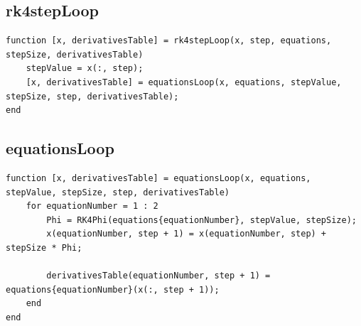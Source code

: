 \subsection{rk4stepLoop}
\begin{simplechar}
\begin{lstlisting}
function [x, derivativesTable] = rk4stepLoop(x, step, equations, stepSize, derivativesTable)
    stepValue = x(:, step);
    [x, derivativesTable] = equationsLoop(x, equations, stepValue, stepSize, step, derivativesTable);
end
\end{lstlisting}
\end{simplechar}

\subsection{equationsLoop}
\begin{simplechar}
\begin{lstlisting}
function [x, derivativesTable] = equationsLoop(x, equations, stepValue, stepSize, step, derivativesTable)
    for equationNumber = 1 : 2
        Phi = RK4Phi(equations{equationNumber}, stepValue, stepSize);
        x(equationNumber, step + 1) = x(equationNumber, step) + stepSize * Phi;

        derivativesTable(equationNumber, step + 1) = equations{equationNumber}(x(:, step + 1));
    end
end
\end{lstlisting}
\end{simplechar}

